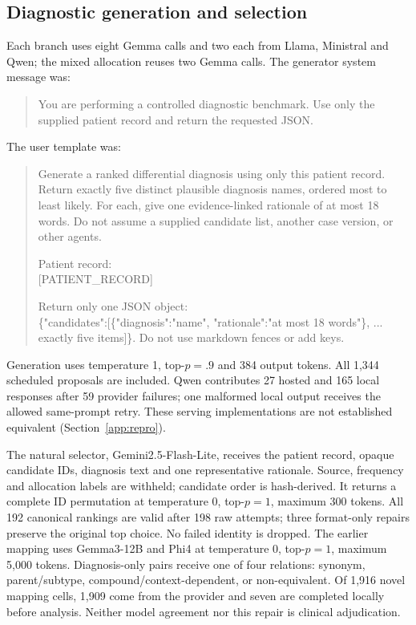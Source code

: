 \subsection{Diagnostic generation and selection}\label{app:prompts}
Each branch uses eight Gemma calls and two each from Llama, Ministral and Qwen; the mixed allocation reuses two Gemma calls. The generator system message was:
\begin{quote}\footnotesize\ttfamily
You are performing a controlled diagnostic benchmark. Use only the supplied patient record and return the requested JSON.
\end{quote}
The user template was:
\begin{quote}\footnotesize\ttfamily
Generate a ranked differential diagnosis using only this patient record. Return exactly five distinct plausible diagnosis names, ordered most to least likely. For each, give one evidence-linked rationale of at most 18 words. Do not assume a supplied candidate list, another case version, or other agents.

Patient record:\\
\mbox{[PATIENT\_RECORD]}

Return only one JSON object:\\ \{"candidates":[\{"diagnosis":"name", "rationale":"at most 18 words"\}, ... exactly five items]\}. Do not use markdown fences or add keys.
\end{quote}
Generation uses temperature 1, top-$p=.9$ and 384 output tokens. All 1,344 scheduled proposals are included. Qwen contributes 27 hosted and 165 local responses after 59 provider failures; one malformed local output receives the allowed same-prompt retry. These serving implementations are not established equivalent (Section~\ref{app:repro}).

The natural selector, Gemini2.5-Flash-Lite, receives the patient record, opaque candidate IDs, diagnosis text and one representative rationale. Source, frequency and allocation labels are withheld; candidate order is hash-derived. It returns a complete ID permutation at temperature 0, top-$p=1$, maximum 300 tokens. All 192 canonical rankings are valid after 198 raw attempts; three format-only repairs preserve the original top choice. No failed identity is dropped. The earlier mapping uses Gemma3-12B and Phi4 at temperature 0, top-$p=1$, maximum 5,000 tokens. Diagnosis-only pairs receive one of four relations: synonym, parent/subtype, compound/context-dependent, or non-equivalent. Of 1,916 novel mapping cells, 1,909 come from the provider and seven are completed locally before analysis. Neither model agreement nor this repair is clinical adjudication.

